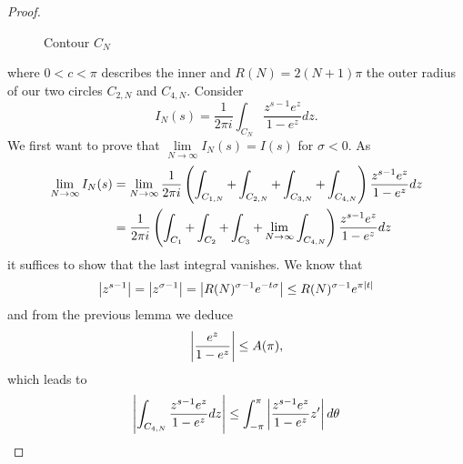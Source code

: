 \begin{proof}
\begin{figure}[!htb]
\begin{minipage}[c]{0.45\textwidth}
\end{minipage}
\caption{Contour $C_N$}
\label{fig:ContourCN}
\end{figure}
	where $0 < c < \pi$ describes the inner and $R(N) = 2(N + 1) \pi$ the outer radius of our two circles $C_{2,N}$ and $C_{4,N}$. Consider
\begin{equation*}
	I_N(s) = \frac{1}{2 \pi i} \int _{C_N} \frac{z^{s - 1} e^z}{1 - e^z} dz.
\end{equation*}
	We first want to prove that $\lim\limits_{N \to \infty} I_N(s) = I(s)$ for $\sigma < 0$. As
\begin{equation*}
\begin{aligned}
	\lim\limits_{N \to \infty} I_N(s)
		&= \lim\limits_{N \to \infty} \frac{1}{2 \pi i} \left(\int_{C_{1,N}} + \int_{C_{2,N}} + \int_{C_{3,N}} + \int_{C_{4,N}}\right) \frac{z^{s - 1} e^z}{1 - e^z} dz \\
		&= \frac{1}{2 \pi i} \left(\int_{C_{1}} + \int_{C_{2}} + \int_{C_{3}} + \lim\limits_{N \to \infty}\int_{C_{4,N}}\right) \frac{z^{s - 1} e^z}{1 - e^z} dz
\end{aligned}
\end{equation*}
	it suffices to show that the last integral vanishes. We know that
\begin{equation*}
	\left|z^{s - 1}\right| = \left|z^{\sigma - 1}\right| = \left|R(N)^{\sigma - 1} e^{-t \sigma}\right| \leq R(N)^{\sigma -1} e^{\pi \left|t\right|}
\end{equation*}
	and from the previous lemma we deduce
\begin{equation*}
	\left|\frac{e^z}{1 - e^z}\right| \leq A(\pi),
\end{equation*}
	which leads to
\begin{equation*}
\begin{aligned}	
	\abs{\int_{C_{4,N}} \frac{z^{s - 1} e^z}{1 - e^z} dz}
	&\leq \int_{-\pi}^{\pi} \abs{\frac{z^{s - 1} e^z}{1 - e^z} z^\prime} d\theta \\

\end{aligned}
\end{equation*}
\end{proof}
